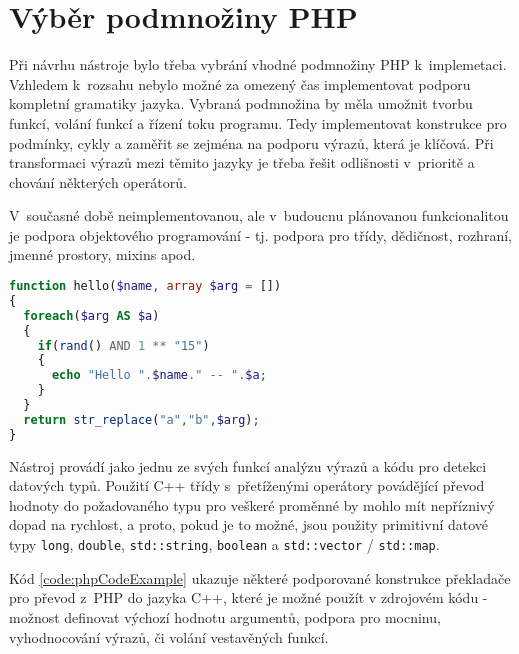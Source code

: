 \documentclass[czech]{ExcelAtFIT}
\newcommand{\function}[1]{\texttt{#1}}
\begin{document}
\section{Výběr podmnožiny PHP}

	Při návrhu nástroje bylo třeba vybrání vhodné pod\-mno\-žin\-y PHP k~implemetaci. Vzhledem k~rozsahu nebylo možné za omezený čas implementovat podporu kompletní gramatiky jazyka. Vybraná podmnožina by měla umožnit tvorbu funkcí, volání funkcí a řízení toku programu. Tedy implementovat konstrukce pro podmínky, cykly a zaměřit se zejména na podporu výrazů, která je klíčová. Při transformaci výrazů mezi těmito jazyky je třeba řešit odlišnosti v~prioritě a chování některých operátorů.

	V~současné době neimplementovanou, ale v~budoucnu plánovanou funkcionalitou je podpora objektového programování - tj. podpora pro třídy, dědičnost, rozhraní, jmenné prostory, mixins apod.

\begin{lstlisting}[caption=Podporované výrazy PHP, label=code:phpCodeExample, language=PHP]
function hello($name, array $arg = [])
{
  foreach($arg AS $a)
  {
    if(rand() AND 1 ** "15")
    {
      echo "Hello ".$name." -- ".$a;
    }
  }
  return str_replace("a","b",$arg);
}
\end{lstlisting}

	Nástroj provádí jako jednu ze svých funkcí analýzu výrazů a kódu pro detekci datových typů. Použití C++ třídy s~přetíženými operátory povádějící převod hodnoty do požadovaného typu pro veškeré proměnné by mohlo mít nepříznivý dopad na rychlost, a proto, pokud je to možné, jsou použity primitivní datové typy \function{long}, \function{double}, \function{std::string}, \function{boolean} a \function{std::vector} / \function{std::map}.



	Kód \ref{code:phpCodeExample} ukazuje některé podporované konstrukce překladače pro převod z~PHP do jazyka C++, které je možné použít v zdrojovém kódu - možnost definovat výchozí hodnotu argumentů, podpora pro mocninu, vyhodnocování výrazů, či volání ve\-sta\-vě\-ných funkcí.


\end{document}
